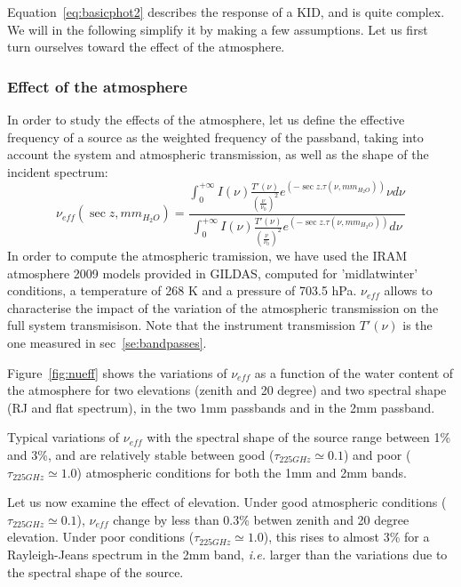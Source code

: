 Equation~\ref{eq:basicphot2} describes the response of a KID, and  
is quite complex. We will in the following simplify it by making a few
assumptions. Let us first turn ourselves toward the effect of the
atmosphere. 


\subsubsection{Effect of the atmosphere}

In order to study the effects of the atmosphere, let us define the
effective frequency of a source as the weighted frequency of the
passband, taking into account the system and atmospheric transmission,
as well as the shape of the incident spectrum:
\begin{equation}
\nu_{eff}( \sec z, mm_{H_{2}O}) = \frac{ \int_{0}^{+\infty} I(\nu) \frac{T'(\nu)}{\left(\frac{\nu}{\nu_{0}}\right)^{2}} e^{\left(-\sec z
  . \tau(\nu,  mm_{H_{2}O})\right)} \nu d\nu } { \int_{0}^{+\infty} I(\nu) \frac{T'(\nu)}{\left(\frac{\nu}{\nu_{0}}\right)^{2}} e^{\left(-\sec z
  . \tau(\nu,  mm_{H_{2}O})\right)}  d\nu}
\label{eq:nueff}
\end{equation}
In order to compute the atmospheric tramission, we have used
the IRAM atmosphere 2009 models provided in GILDAS, computed for
'midlatwinter' conditions, a temperature of 268 K  and a pressure of 703.5
hPa. $\nu_{eff}$ allows to characterise the impact of the variation of
the atmospheric transmission on the full system transmisison.  Note
that the instrument transmission $T'(\nu)$ is the one measured in
sec~\ref{se:bandpasses}. 

Figure~\ref{fig:nueff} shows the variations of
$\nu_{eff}$ as a function of the water content of the atmosphere for
two elevations (zenith and 20 degree) and two spectral shape (RJ and
flat spectrum), in the two 1mm passbands and in the 2mm passband. 

Typical variations of $\nu_{eff}$ with the spectral shape of the
source range between 1\% and 3\%, and are relatively stable between good
($\tau_{225GHz} \simeq 0.1$) and
poor  ($\tau_{225GHz} \simeq 1.0$) atmospheric conditions for both the
1mm and 2mm bands. 


Let us now examine the effect of elevation.
Under good atmospheric conditions ($\tau_{225GHz} \simeq 0.1$), $\nu_{eff}$ change by
less than 0.3\% betwen zenith and 20 degree elevation. Under poor
conditions ($\tau_{225GHz} \simeq 1.0$), this rises to almost 3\% for
a Rayleigh-Jeans spectrum in the 2mm band, {\it i.e.} larger than the
  variations due to the spectral shape of the source.



